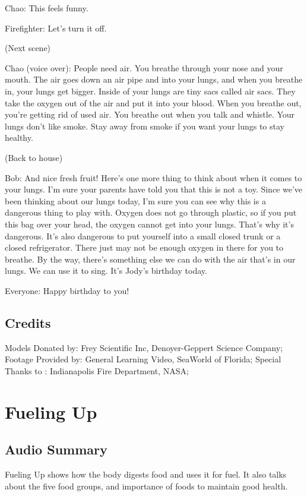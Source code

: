 Chao: This feels funny.

Firefighter: Let's turn it off.

(Next scene)

Chao (voice over): People need air. You breathe through your nose and your mouth. The air goes down an air pipe and into your lungs, and when you breathe in, your lungs get bigger. Inside of your lungs are tiny sacs called air sacs. They take the oxygen out of the air and put it into your blood. When you breathe out, you're getting rid of used air. You breathe out when you talk and whistle. Your lungs don't like smoke. Stay away from smoke if you want your lungs to stay healthy.

(Back to house)

Bob: And nice fresh fruit! Here's one more thing to think about when it comes to your lungs. I'm sure your parents have told you that this is not a toy. Since we've been thinking about our lungs today, I'm sure you can see why this is a dangerous thing to play with. Oxygen does not go through plastic, so if you put this bag over your head, the oxygen cannot get into your lungs. That's why it's dangerous. It's also dangerous to put yourself into a small closed trunk or a closed refrigerator. There just may not be enough oxygen in there for you to breathe. By the way, there's something else we can do with the air that's in our lungs. We can use it to sing. It's Jody's birthday today.

Everyone: Happy birthday to you!

\subsection{Credits}

Models Donated by: Frey Scientific Inc, Denoyer-Geppert Science Company;
Footage Provided by: General Learning Video, SeaWorld of Florida;
Special Thanks to : Indianapolis Fire Department, NASA;

\section{Fueling Up}

\subsection{Audio Summary}

Fueling Up shows how the body digests food and uses it for fuel. It also talks about the five food groups, and importance of foods to maintain good health.

